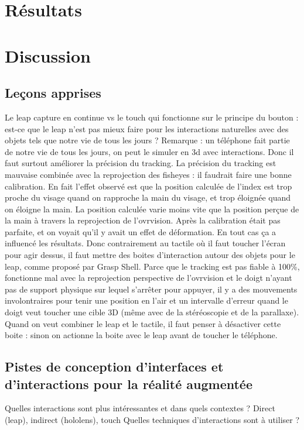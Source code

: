 \section{Résultats}


\section{Discussion}
\subsection{Leçons apprises}
Le leap capture en continue vs le touch qui fonctionne sur le principe du bouton : est-ce que le leap n'est pas mieux faire pour les interactions naturelles avec des objets tels que notre vie de tous les jours ? Remarque : un téléphone fait partie de notre vie de tous les jours, on peut le simuler en 3d avec interactions. Donc il faut surtout améliorer la précision du tracking.
La précision du tracking est mauvaise combinée avec la reprojection des fisheyes : il faudrait faire une bonne calibration. En fait l'effet observé est que la position calculée de l'index est trop proche du visage quand on rapproche la main du visage, et trop éloignée quand on éloigne la main. La position calculée varie moins vite que la position perçue de la main à travers la reprojection de l'ovrvision. Après la calibration était pas parfaite, et on voyait qu'il y avait un effet de déformation. En tout cas ça a influencé les résultats.
Donc contrairement au tactile où il faut toucher l'écran pour agir dessus, il faut mettre des boites d'interaction autour des objets pour le leap, comme proposé par Grasp Shell. Parce que le tracking est pas fiable à 100\%, fonctionne mal avec la reprojection perspective de l'ovrvision et le doigt n'ayant pas de support physique sur lequel s'arrêter pour appuyer, il y a des mouvements involontraires pour tenir une position en l'air et un intervalle d'erreur quand le doigt veut toucher une cible 3D (même avec de la stéréoscopie et de la parallaxe).
Quand on veut combiner le leap et le tactile, il faut penser à désactiver cette boite : sinon on actionne la boite avec le leap avant de toucher le téléphone.


\subsection{Pistes de conception d'interfaces et d'interactions pour la réalité augmentée}
Quelles interactions sont plus intéressantes et dans quels contextes ? Direct (leap), indirect (hololens), touch
Quelles techniques d'interactions sont à utiliser ?